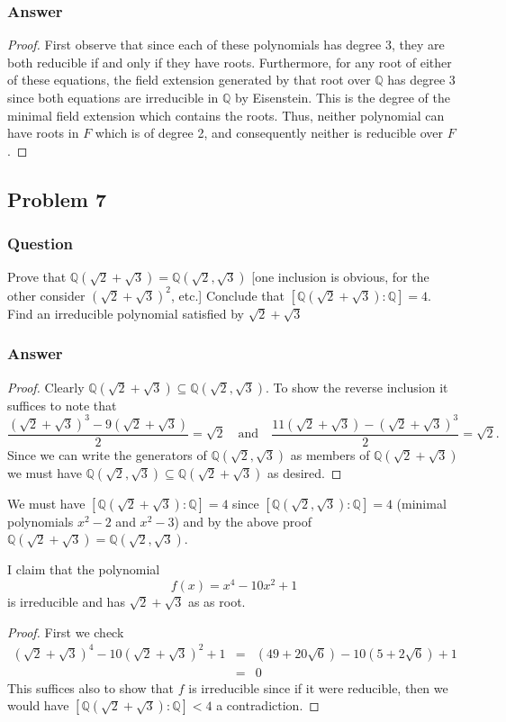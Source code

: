 \documentclass[10pt]{article}
\begin{document}
\subsubsection{Answer}
\begin{proof}First observe that since each of these polynomials has degree 3, they are both reducible if and only if they have roots. Furthermore, for any root of either of these equations, the field extension generated by that root over $\mathbb{Q}$ has degree 3 since both equations are irreducible in $\mathbb{Q}$ by Eisenstein. This is the degree of the minimal field extension which contains the roots. Thus, neither polynomial can have roots in $F$ which is of degree 2, and consequently neither is reducible over $F$.\end{proof}

\subsection{Problem 7}
\subsubsection{Question}
Prove that $\mathbb{Q}(\sqrt2+\sqrt3)=\mathbb{Q}(\sqrt2,\sqrt3)$ [one inclusion is obvious, for the other consider $(\sqrt2+\sqrt3)^2$, etc.] Conclude that $[\mathbb{Q}(\sqrt2+\sqrt3):\mathbb{Q}]=4$. Find an irreducible polynomial satisfied by $\sqrt2+\sqrt3$
\subsubsection{Answer}
\begin{proof}
Clearly $\mathbb{Q}(\sqrt2+\sqrt3) \subseteq \mathbb{Q}(\sqrt2,\sqrt3)$. To show the reverse inclusion it suffices to note that
\[\frac{(\sqrt{2}+\sqrt{3})^3-9(\sqrt{2}+\sqrt{3})}{2}=\sqrt2 \quad\mathrm{and}\quad\frac{11(\sqrt{2}+\sqrt{3})-(\sqrt{2}+\sqrt{3})^3}{2}=\sqrt2.\]
Since we can write the generators of $\mathbb{Q}(\sqrt2,\sqrt3)$ as members of $\mathbb{Q}(\sqrt2+\sqrt3)$ we must have  $\mathbb{Q}(\sqrt2,\sqrt3)\subseteq \mathbb{Q}(\sqrt2+\sqrt3)$ as desired.
\end{proof}

We must have $[\mathbb{Q}(\sqrt2+\sqrt3):\mathbb{Q}]=4$ since $[\mathbb{Q}(\sqrt2,\sqrt3):\mathbb{Q}]=4$ (minimal polynomials $x^2-2$ and $x^2-3$) and by the above proof  $\mathbb{Q}(\sqrt2+\sqrt3)=\mathbb{Q}(\sqrt2,\sqrt3)$.

I claim that the polynomial
\[f(x)=x^4-10x^2+1\]
is irreducible and has $\sqrt2+\sqrt3$ as as root.
\begin{proof}
First we check 
\begin{eqnarray*}(\sqrt2+\sqrt3)^4-10(\sqrt2+\sqrt3)^2+1&=& (49+20 \sqrt{6}) -10(5+2 \sqrt{6})+1 \\ &=& 0 \end{eqnarray*}
This suffices also to show that $f$ is irreducible since if it were reducible, then we would have $[\mathbb{Q}(\sqrt2+\sqrt3):\mathbb{Q}]<4$ a contradiction.
\end{proof}
\end{document}
